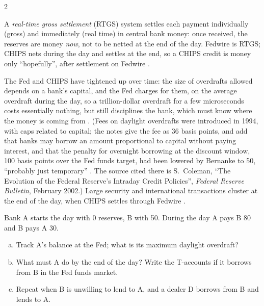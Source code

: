 \begin{paracol}{2}
\begin{definition}
A \emph{real-time gross settlement} (RTGS) system settles each payment individually (gross) and immediately (real time) in central bank money: once
received, the reserves are money \emph{now}, not to be netted at the end of the day. Fedwire is RTGS; CHIPS nets during the day and settles at the end,
so a CHIPS credit is money only ``hopefully'', after settlement on Fedwire .
\end{definition}

\begin{coursenote}
The Fed and CHIPS have tightened up over time: the size of overdrafts allowed depends on a bank's capital, and the Fed charges for them, on the average
overdraft during the day, so a trillion-dollar overdraft for a few microseconds costs essentially nothing, but still disciplines the bank, which must know
where the money is coming from . (Fees on daylight overdrafts were introduced in 1994, with caps related to capital; the notes give the fee as 36 basis points, and add that banks may
borrow an amount proportional to capital without paying interest, and that the penalty for overnight borrowing at the discount window, 100 basis points over
the Fed funds target, had been lowered by Bernanke to 50, ``probably just temporary'' . The source cited there is S.~Coleman, ``The Evolution
of the Federal Reserve's Intraday Credit Policies'', \emph{Federal Reserve Bulletin}, February 2002.) Large security and international transactions cluster at the end of the day, when CHIPS
settles through Fedwire .
\end{coursenote}

\begin{exercise}
Bank A starts the day with 0 reserves, B with 50. During the day A pays B 80 and B pays A 30.
\begin{enumerate}[(a)]
  \item Track A's balance at the Fed; what is its maximum daylight overdraft?
  \item What must A do by the end of the day? Write the T-accounts if it borrows from B in the Fed funds market.
  \item Repeat when B is unwilling to lend to A, and a dealer D borrows from B and lends to A.
\end{enumerate}
\end{exercise}


\end{paracol}
